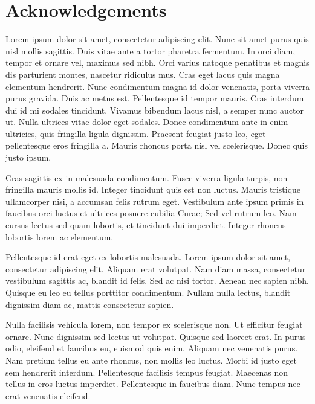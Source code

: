 \section*{Acknowledgements}
\label{cheers}

Lorem ipsum dolor sit amet, consectetur adipiscing elit. Nunc sit amet purus quis nisl mollis sagittis. Duis vitae ante a tortor pharetra fermentum. In orci diam, tempor et ornare vel, maximus sed nibh. Orci varius natoque penatibus et magnis dis parturient montes, nascetur ridiculus mus. Cras eget lacus quis magna elementum hendrerit. Nunc condimentum magna id dolor venenatis, porta viverra purus gravida. Duis ac metus est. Pellentesque id tempor mauris. Cras interdum dui id mi sodales tincidunt. Vivamus bibendum lacus nisl, a semper nunc auctor ut. Nulla ultrices vitae dolor eget sodales. Donec condimentum ante in enim ultricies, quis fringilla ligula dignissim. Praesent feugiat justo leo, eget pellentesque eros fringilla a. Mauris rhoncus porta nisl vel scelerisque. Donec quis justo ipsum.

Cras sagittis ex in malesuada condimentum. Fusce viverra ligula turpis, non fringilla mauris mollis id. Integer tincidunt quis est non luctus. Mauris tristique ullamcorper nisi, a accumsan felis rutrum eget. Vestibulum ante ipsum primis in faucibus orci luctus et ultrices posuere cubilia Curae; Sed vel rutrum leo. Nam cursus lectus sed quam lobortis, et tincidunt dui imperdiet. Integer rhoncus lobortis lorem ac elementum.

Pellentesque id erat eget ex lobortis malesuada. Lorem ipsum dolor sit amet, consectetur adipiscing elit. Aliquam erat volutpat. Nam diam massa, consectetur vestibulum sagittis ac, blandit id felis. Sed ac nisi tortor. Aenean nec sapien nibh. Quisque eu leo eu tellus porttitor condimentum. Nullam nulla lectus, blandit dignissim diam ac, mattis consectetur sapien.

Nulla facilisis vehicula lorem, non tempor ex scelerisque non. Ut efficitur feugiat ornare. Nunc dignissim sed lectus ut volutpat. Quisque sed laoreet erat. In purus odio, eleifend et faucibus eu, euismod quis enim. Aliquam nec venenatis purus. Nam pretium tellus eu ante rhoncus, non mollis leo luctus. Morbi id justo eget sem hendrerit interdum. Pellentesque facilisis tempus feugiat. Maecenas non tellus in eros luctus imperdiet. Pellentesque in faucibus diam. Nunc tempus nec erat venenatis eleifend.
